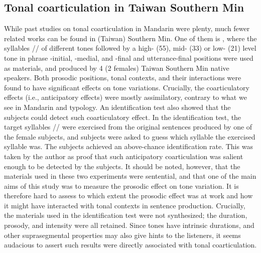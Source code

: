 \documentclass[12pt]{report}
\newcommand{\tip}{\textipa}
\begin{document}
\begin{CJK}{UTF8}{bsmi}
\section{Tonal coarticulation in Taiwan Southern Min}
While past studies on tonal coarticulation in Mandarin were plenty, much fewer related works can be found in (Taiwan) Southern Min. One of them is \cite{Peng1997}, where the syllables /\tip{kaw}/ of different tones followed by a high- (55), mid- (33) or low- (21) level tone in phrase -initial, -medial, and -final and utterance-final positions were used as materials, and produced by 4 (2 females) Taiwan Southern Min native speakers. Both prosodic positions, tonal contexts, and their interactions were found to have significant effects on tone variations. Crucially, the coarticulatory effects (i.e., anticipatory effects) were mostly assimilatory, contrary to what we see in Mandarin and typology. An identification test also showed that the subjects could detect such coarticulatory effect. In the identification test, the target syllables /\tip{kau}/ were exercised from the original sentences produced by one of the female subjects, and subjects were asked to guess which syllable the exercised syllable was. The subjects achieved an above-chance identification rate. This was taken by the author as proof that such anticipatory coarticulation was salient enough to be detected by the subjects. It should be noted, however, that  the materials used in these two experiments were sentential, and that one of the main aims of this study was to measure the prosodic effect on tone variation. It is therefore hard to assess to which extent the prosodic effect was at work and how it might have interacted with tonal contexts in sentence production. Crucially, the materials used in the identification test were not synthesized; the duration, prosody, and intensity were all retained. Since tones have intrinsic durations, and other suprasegmental properties may also give hints to the listeners, it seems audacious to assert such results were directly associated with tonal coarticulation.


\end{CJK}
\end{document}
